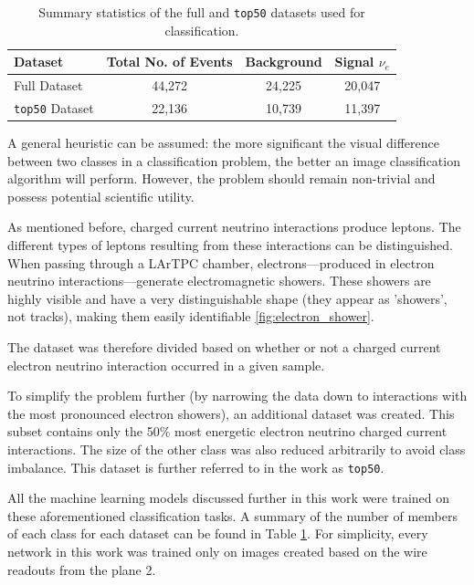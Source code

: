 \documentclass{pracalicmgr}
\begin{document}
\begin{table}[H]
    \centering
    \caption{Summary statistics of the full and \texttt{top50} datasets used for classification.}
    \label{tab:dataset_stats}
    \begin{tabular}{lccc}
        \toprule
        \textbf{Dataset} & \textbf{Total No. of Events} & \textbf{Background} & \textbf{Signal $\nu_e$ } \\
        \midrule
        Full Dataset     & 44,272                 & 24,225 & 20,047 \\
        \texttt{top50} Dataset & 22,136                 & 10,739 & 11,397 \\
        \bottomrule
    \end{tabular}
\end{table}

A general heuristic can be assumed: the more significant the visual difference between two classes in a classification problem, the better an image classification algorithm will perform. However, the problem should remain non-trivial and possess potential scientific utility.

As mentioned before, charged current neutrino interactions produce leptons. The different types of leptons resulting from these interactions can be distinguished. When passing through a LArTPC chamber, electrons—produced in electron neutrino interactions—generate electromagnetic showers. These showers are highly visible and have a very distinguishable shape (they appear as 'showers', not tracks), making them easily identifiable \ref{fig:electron_shower}.

The dataset was therefore divided based on whether or not a charged current electron neutrino interaction occurred in a given sample.

To simplify the problem further (by narrowing the data down to interactions with the most pronounced electron showers), an additional dataset was created. This subset contains only the 50\% most energetic electron neutrino charged current interactions. The size of the other class was also reduced arbitrarily to avoid class imbalance. This dataset is further referred to in the work as \texttt{top50}.

All the machine learning models discussed further in this work were trained on these aforementioned classification tasks. A summary of the number of members of each class for each dataset can be found in Table \ref{tab:dataset_stats}. For simplicity, every network in this work was trained only on images created based on the wire readouts from the plane 2.
\end{document}
